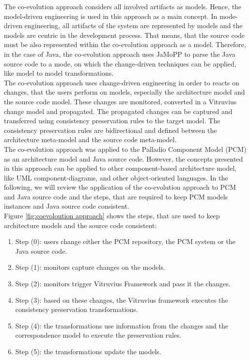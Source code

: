 The co-evolution approach considers all involved artifacts as models. Hence, the model-driven engineering is used in this approach as a main concept. In mode-driven engineering, all artifacts of the system are represented by models and the models are centric in the development process. That means, that the source code must be also represented within the co-evolution approach as a model. Therefore, in the case of Java, the co-evolution approach uses JaMoPP to parse the Java source code to a mode, on which the change-driven techniques can be applied, like model to model transformations.\\

The co-evolution approach uses change-driven engineering in order to reacts on changes, that the users perform on models, especially the architecture model and the source code model. These changes are monitored, converted in a Vitruvius change model and propagated. The propagated changes can be captured and transferred using consistency preservation rules to the target model. The consistency preservation rules are bidirectional and defined between the architecture meta-model and the source code meta-model.\\

The co-evolution approach was applied to the Palladio Component Model (PCM) as an architecture model and Java source code.  However, the concepts presented in this approach can be applied to other component-based architecture model, like UML component-diagrams, and other object-oriented languages. In the following, we will review the application of the co-evolution approach to PCM and Java source code and the steps, that are required to keep PCM models instances and Java source code consistent.\\ 



Figure  \ref{fig:coevoloution approach} shows the steps, that are used to keep architecture models and the source code consistent:

\begin{enumerate}
\item Step (0): users change either the PCM repository, the PCM system or the Java source code.  
\item Step (1): monitors capture changes on the models.
\item Step (2):  monitors trigger Vitruvius Framework and pass it the changes.
\item Step (3): based on these changes, the Vitruvius framework executes the consistency preservation transformations. 
\item Step (4): the transformations use information from the changes and the correspondence model to execute the preservation rules.
\item Step (5): the transformations update the models. 
\end{enumerate}

